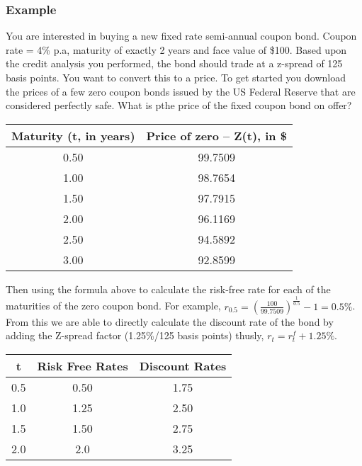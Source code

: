 \documentclass[a4paper]{article}
\begin{document}
\subsubsection{Example}
You are interested in buying a new fixed rate semi-annual coupon bond. Coupon
rate = 4\% p.a, maturity of exactly 2 years and face value of \$100. Based upon
the credit analysis you performed, the bond should trade at a z-spread of 125
basis points. You want to convert this to a price. To get started you download
the prices of a few zero coupon bonds issued by the US Federal Reserve that are
considered perfectly safe. What is pthe price of the fixed coupon bond on offer?
\begin{center}
\begin{tabular}{|c|c|}
\hline
Maturity (t, in years) & Price of zero – Z(t), in \$  \\ \hline
0.50                   & 99.7509                                       \\ \hline
1.00                   & 98.7654                                       \\ \hline
1.50                   & 97.7915                                       \\ \hline
2.00                   & 96.1169                                       \\ \hline
2.50                   & 94.5892                                       \\ \hline
3.00                   & 92.8599									   \\
\hline
\end{tabular}
\end{center}
Then using the formula above to calculate the risk-free rate for each of the
maturities of the zero coupon bond. For example,
$r_{0.5} = (\frac{100}{99.7509})^{\frac{1}{0.5}} - 1 = 0.5\%$. From this we are
able to directly calculate the discount rate of the bond by adding the Z-spread
factor (1.25\%/125 basis points) thusly, $r_t = r_t^f + 1.25\%$.
\begin{center}
\begin{tabular}{|c|c|c|}
\hline
t   & Risk Free Rates & Discount Rates \\ \hline
0.5 & 0.50            & 1.75           \\ \hline
1.0 & 1.25            & 2.50           \\ \hline
1.5 & 1.50            & 2.75           \\ \hline
2.0 & 2.0             & 3.25           \\ \hline
\end{tabular}
\end{center}
\end{document}

